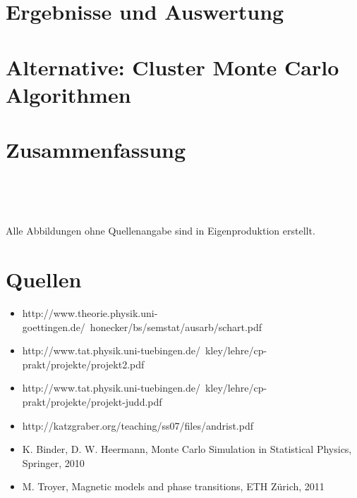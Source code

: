 \documentclass[12pt,a4paper, german]{article}
\begin{document}
\section{Ergebnisse und Auswertung}

\newpage
\section{Alternative: Cluster Monte Carlo Algorithmen}

\newpage
\section{Zusammenfassung}

\newpage
\listoffigures

\

\

Alle Abbildungen ohne Quellenangabe sind in Eigenproduktion erstellt.


\section*{Quellen}
\begin{itemize}
\item http://www.theorie.physik.uni-goettingen.de/~honecker/bs/semstat/ausarb/schart.pdf\\
\item http://www.tat.physik.uni-tuebingen.de/~kley/lehre/cp-prakt/projekte/projekt2.pdf\\
\item http://www.tat.physik.uni-tuebingen.de/~kley/lehre/cp-prakt/projekte/projekt-judd.pdf\\
\item http://katzgraber.org/teaching/ss07/files/andrist.pdf\\
\item K. Binder, D. W. Heermann, Monte Carlo Simulation in Statistical Physics, Springer, 2010
\item M. Troyer, Magnetic models and phase transitions, ETH Zürich, 2011
\end{itemize}
\newpage
\end{document}

